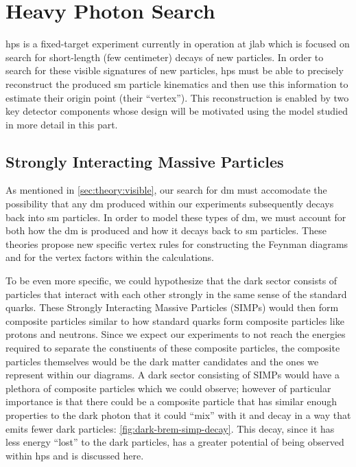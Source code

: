 \chapter{Heavy Photon Search}
\label{chapter:hps:experiment}

\acf{hps} is a fixed-target experiment currently in operation at \ac{jlab}
which is focused on search for short-length (few centimeter) decays of new particles.
In order to search for these visible signatures of new particles,
\ac{hps} must be able to precisely reconstruct the produced \ac{sm} particle
kinematics and then use this information to estimate their origin point (their
``vertex'').
This reconstruction is enabled by two key detector components whose design
will be motivated using the model studied in more detail in this part.

\section{Strongly Interacting Massive Particles}
\label{sec:hps:simps}

As mentioned in \cref{sec:theory:visible}, our search for \ac{dm} must accomodate the possibility
that any \ac{dm} produced within our experiments subsequently decays back into \ac{sm} particles.
In order to model these types of \ac{dm}, we must account for both how the \ac{dm} is produced and
how it decays back to \ac{sm} particles. These theories propose new specific vertex rules for
constructing the Feynman diagrams and for the vertex factors within the calculations.

To be even more specific, we could hypothesize that the dark sector consists of particles that
interact with each other strongly in the same sense of the standard quarks. These Strongly
Interacting Massive Particles (SIMPs) \cite{simp-mechanism-2014,simp-pheno-2018} would then form
composite particles similar to how standard quarks form composite particles like protons and
neutrons. Since we expect our experiments to not reach the energies required to separate the
constiuents of these composite particles, the composite particles themselves would be the dark
matter candidates and the ones we represent within our diagrams. A dark sector consisting of SIMPs
would have a plethora of composite particles which we could observe; however of particular
importance is that there could be a composite particle that has similar enough properties to the
dark photon that it could ``mix'' with it and decay in a way that emits fewer dark particles:
\cref{fig:dark-brem-simp-decay}. This decay, since it has less energy ``lost'' to the dark
particles, has a greater potential of being observed within \ac{hps} and is discussed here.

